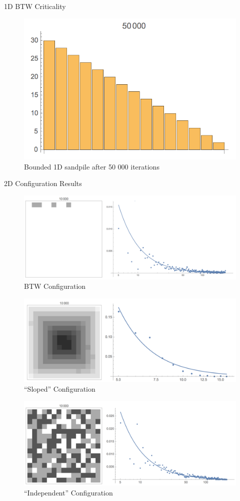 \documentclass[final]{beamer}
\newlength{\onecolwid}
\begin{document}
\begin{frame}[t]
\begin{columns}[t]
\begin{column}{\onecolwid}
\begin{block}{1D BTW Criticality}
\begin{figure}
\includegraphics[width=0.6\linewidth]{1D.jpg}
\caption{Bounded 1D sandpile after 50 000 iterations}
\end{figure}
\end{block}



\begin{block}{2D Configuration Results}

\begin{figure}
\includegraphics[width=0.8\linewidth]{2D-btw.jpg}
\caption{BTW Configuration}
\end{figure}

\begin{figure}
\includegraphics[width=0.8\linewidth]{2D-sloped.jpg}
\caption{``Sloped'' Configuration}
\end{figure}

\begin{figure}
\includegraphics[width=0.8\linewidth]{2D-indep.jpg}
\caption{``Independent'' Configuration}
\end{figure}


\end{block}
\end{column}
\end{columns}
\end{frame}
\end{document}
